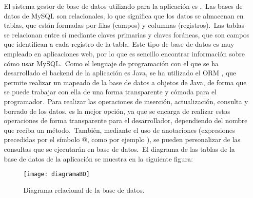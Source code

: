 
El sistema gestor de base de datos utilizado para la aplicación es .\ Las bases de datos de MySQL son
relacionales, lo que significa que los datos se almacenan en tablas, que están formadas por filas (campos) y columnas
(registros).\ Las tablas se relacionan entre sí mediante claves primarias y claves foráneas, que son campos que
identifican a cada registro de la tabla.
Este tipo de base de datos es muy empleado en aplicaciones web, por lo que es sencillo encontrar información sobre
cómo usar MySQL\@.\ Como el lenguaje de programación con el que se ha desarrollado el backend de la aplicación es
Java, se ha utilizado el ORM , que permite realizar un mapeado de la base de datos a objetos de
Java, de forma que se puede trabajar con ella de una forma transparente y cómoda para el programador.\ Para realizar
las operaciones de inserción, actualización, consulta y borrado de los datos,  es la
mejor opción, ya que se encarga de realizar estas operaciones de forma transparente para el desarrollador,
dependiendo del nombre que reciba un método.\ También, mediante el uso de anotaciones (expresiones precedidas por el
símbolo @, como por ejemplo ), se pueden personalizar de las consultas que se ejecutarán en base de
datos.\ El diagrama de las tablas de la base de datos de la aplicación se muestra en la siguiente figura:

\begin{figure}[H]
	\centering
	\texttt{[image: diagramaBD]}
	\caption{Diagrama relacional de la base de datos.}
	\label{fig:diagrama-tablas}
\end{figure}
